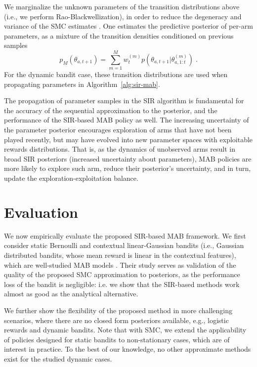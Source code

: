 \documentclass{article}
\newcommand{\ie}{i.e., }
\newcommand{\eg}{e.g., }
\begin{document}
We marginalize the unknown parameters of the transition distributions above (\ie we perform Rao-Blackwellization), in order to reduce the degeneracy and variance of the SMC estimates \cite{ip-Doucet2000,ib-Djuric2010}. One estimates the predictive posterior of per-arm parameters, as a mixture of the transition densities conditioned on previous samples
\begin{equation}
p_M(\theta_{a,t+1}) = \sum_{m=1}^{M} w_{t}^{(m)} p(\theta_{a,t+1}|\theta_{a,1:t}^{(m)}) \; .
\end{equation}
For the dynamic bandit case, these transition distributions are used when propagating parameters in Algorithm~\ref{alg:sir-mab}.

The propagation of parameter samples in the SIR algorithm is fundamental for the accuracy of the sequential approximation to the posterior, and the performance of the SIR-based MAB policy as well. The increasing uncertainty of the parameter posterior encourages exploration of arms that have not been played recently, but may have evolved into new parameter spaces with exploitable rewards distributions. That is, as the dynamics of unobserved arms result in broad SIR posteriors (increased uncertainty about parameters), MAB policies are more likely to explore such arm, reduce their posterior's uncertainty, and in turn, update the exploration-exploitation balance.

\section{Evaluation}
\label{sec:evaluation}

We now empirically evaluate the proposed SIR-based MAB framework. We first consider static Bernoulli and contextual linear-Gaussian bandits (\ie Gaussian distributed bandits, whose mean reward is linear in the contextual features), which are well-studied MAB models \cite{j-Scott2010,ic-Chapelle2011,j-Agrawal2012,j-Agrawal2012a,ip-Kaufmann2012,ic-Korda2013}. Their study serves as validation of the quality of the proposed SMC approximation to posteriors, as the performance loss of the bandit is negligible: i.e. we show that the SIR-based methods work almost as good as the analytical alternative.

We further show the flexibility of the proposed method in more challenging scenarios, where there are no closed form posteriors available, \eg logistic rewards and dynamic bandits. Note that with SMC, we extend the applicability of policies designed for static bandits to non-stationary cases, which are of interest in practice. To the best of our knowledge, no other approximate methods exist for the studied dynamic cases.
\end{document}
